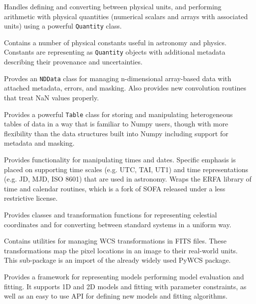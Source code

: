 \documentclass[11pt,twoside]{article}
\begin{document}
Handles defining and converting between physical units, and performing
arithmetic with physical quantities (numerical scalars and arrays with
associated units) using a powerful \texttt{Quantity} class.


Contains a number of physical constants useful in astronomy and physics.
Constants are representing as \texttt{Quantity} objects with additional
metadata describing their provenance and uncertainties.


Provdes an \texttt{NDData} class for managing n-dimensional array-based data
with attached metadata, errors, and masking. Also provides new convolution
routines that treat NaN values properly.


Provides a powerful \texttt{Table} class for storing and manipulating
heterogeneous tables of data in a way that is familiar to Numpy users, though
with more flexibility than the data structures built into Numpy including
support for metadata and masking.

Provides functionality for manipulating times and dates. Specific emphasis is
placed on supporting time scales (e.g. UTC, TAI, UT1) and time representations
(e.g. JD, MJD, ISO 8601) that are used in astronomy. Wraps the ERFA library of
time and calendar routines, which is a fork of SOFA released under a less
restrictive license.


Provides classes and transformation functions for representing celestial
coordinates and for converting between standard systems in a uniform way.


Contains utilities for managing WCS transformations in FITS files. These
transformations map the pixel locations in an image to their real-world units.
This sub-package is an import of the already widely used PyWCS package.


Provides a framework for representing models performing model evaluation and
fitting. It supports 1D and 2D models and fitting with parameter constraints,
as well as an easy to use API for defining new models and fitting algorithms.
\end{document}
